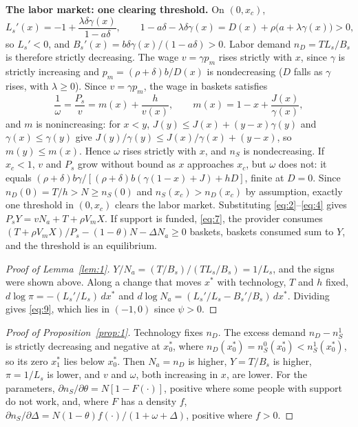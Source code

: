\documentclass[12pt]{article}
\theoremstyle{plain}
\begin{document}
\textbf{The labor market: one clearing threshold.} On $(0,x_c)$,
\[
L_s'(x)=-1+\frac{\lambda\delta\gamma(x)}{1-a\delta},\qquad
1-a\delta-\lambda\delta\gamma(x)=D(x)+\rho\bigl(a+\lambda\gamma(x)\bigr)>0,
\]
so $L_s'<0$, and $B_s'(x)=b\delta\gamma(x)/(1-a\delta)>0$. Labor demand $n_D=TL_s/B_s$ is therefore strictly decreasing. The wage $v=\gamma p_m$ rises strictly with $x$, since $\gamma$ is strictly increasing and $p_m=(\rho+\delta)b/D(x)$ is nondecreasing ($D$ falls as $\gamma$ rises, with $\lambda\ge0$). Since $v=\gamma p_m$, the wage in baskets satisfies
\begin{equation}\label{eq:A1}
\frac{1}{\omega}=\frac{P_s}{v}=m(x)+\frac{h}{v(x)},\qquad m(x)=1-x+\frac{J(x)}{\gamma(x)},
\end{equation}
and $m$ is nonincreasing: for $x<y$, $J(y)\le J(x)+(y-x)\gamma(y)$ and $\gamma(x)\le\gamma(y)$ give $J(y)/\gamma(y)\le J(x)/\gamma(x)+(y-x)$, so $m(y)\le m(x)$. Hence $\omega$ rises strictly with $x$, and $n_S$ is nondecreasing. If $x_c<1$, $v$ and $P_s$ grow without bound as $x$ approaches $x_c$, but $\omega$ does not: it equals $(\rho+\delta)b\gamma/[(\rho+\delta)b(\gamma(1-x)+J)+hD]$, finite at $D=0$. Since $n_D(0)=T/h>N\ge n_S(0)$ and $n_S(x_c)>n_D(x_c)$ by assumption, exactly one threshold in $(0,x_c)$ clears the labor market. Substituting \eqref{eq:2}--\eqref{eq:4} gives $P_sY=vN_a+T+\rho V_mX$. If support is funded, \eqref{eq:7}, the provider consumes $(T+\rho V_mX)/P_s-(1-\theta)N-\Delta N_a\ge0$ baskets, baskets consumed sum to $Y$, and the threshold is an equilibrium.

\begin{proof}[Proof of Lemma~\ref{lem:1}]
$Y/N_a=(T/B_s)/(TL_s/B_s)=1/L_s$, and the signs were shown above. Along a change that moves $x^*$ with technology, $T$ and $h$ fixed, $d\log\pi=-(L_s'/L_s)\,dx^*$ and $d\log N_a=(L_s'/L_s-B_s'/B_s)\,dx^*$. Dividing gives \eqref{eq:9}, which lies in $(-1,0)$ since $\psi>0$.
\end{proof}

\begin{proof}[Proof of Proposition~\ref{prop:1}]
Technology fixes $n_D$. The excess demand $n_D-n_S^1$ is strictly decreasing and negative at $x^*_0$, where $n_D(x^*_0)=n_S^0(x^*_0)<n_S^1(x^*_0)$, so its zero $x^*_1$ lies below $x^*_0$. Then $N_a=n_D$ is higher, $Y=T/B_s$ is higher, $\pi=1/L_s$ is lower, and $v$ and $\omega$, both increasing in $x$, are lower. For the parameters, $\partial n_S/\partial\theta=N[1-F(\cdot)]$, positive where some people with support do not work, and, where $F$ has a density $f$, $\partial n_S/\partial\Delta=N(1-\theta)f(\cdot)/(1+\omega+\Delta)$, positive where $f>0$.
\end{proof}
\end{document}
